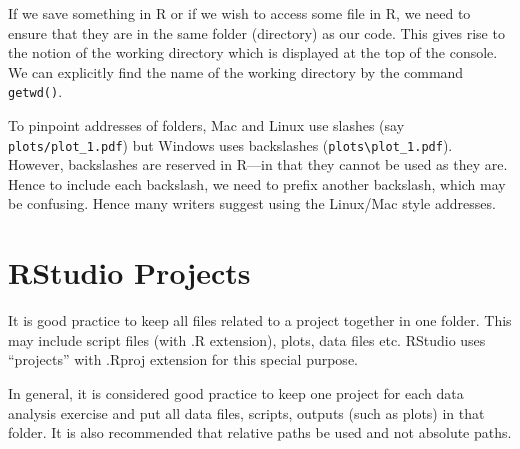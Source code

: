 \documentclass[11pt,]{article}
\begin{document}
If we save something in R or if we wish to access some file in R, we
need to ensure that they are in the same folder (directory) as our code.
This gives rise to the notion of the working directory which is
displayed at the top of the console. We can explicitly find the name of
the working directory by the command \texttt{getwd()}.

To pinpoint addresses of folders, Mac and Linux use slashes (say
\texttt{plots/plot\_1.pdf}) but Windows uses backslashes
(\texttt{plots\textbackslash{}plot\_1.pdf}). However, backslashes are
reserved in R---in that they cannot be used as they are. Hence to
include each backslash, we need to prefix another backslash, which may
be confusing. Hence many writers suggest using the Linux/Mac style
addresses.

\section{RStudio Projects}\label{rstudio-projects}

It is good practice to keep all files related to a project together in
one folder. This may include script files (with .R extension), plots,
data files etc. RStudio uses ``projects'' with .Rproj extension for this
special purpose.

In general, it is considered good practice to keep one project for each
data analysis exercise and put all data files, scripts, outputs (such as
plots) in that folder. It is also recommended that relative paths be
used and not absolute paths.
\end{document}

